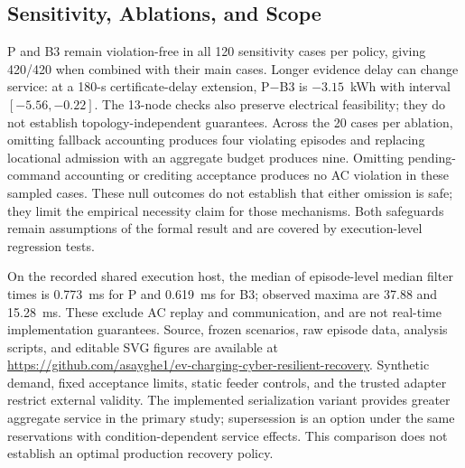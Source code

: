 \subsection{Sensitivity, Ablations, and Scope}
P and B3 remain violation-free in all 120 sensitivity cases per policy,
giving 420/420 when combined with their main cases. Longer evidence delay
can change service: at a 180-s certificate-delay extension, P$-$B3 is
$-3.15$~kWh with interval $[-5.56,-0.22]$. The 13-node checks also preserve
electrical feasibility; they do not establish topology-independent guarantees.
Across the 20 cases per ablation, omitting fallback accounting produces four
violating episodes and replacing locational admission with an aggregate budget
produces nine. Omitting pending-command accounting or crediting acceptance
produces no AC violation in these sampled cases. These null outcomes do not
establish that either omission is safe; they limit the empirical necessity
claim for those mechanisms. Both safeguards remain assumptions of the formal
result and are covered by execution-level regression tests.

On the recorded shared execution host, the median of episode-level median
filter times is 0.773~ms for P and 0.619~ms for B3; observed maxima are
37.88 and 15.28~ms. These exclude AC replay and communication, and are not
real-time implementation guarantees. Source, frozen scenarios, raw episode data,
analysis scripts, and editable SVG figures are available at
\url{https://github.com/asayghe1/ev-charging-cyber-resilient-recovery}.
Synthetic demand, fixed acceptance limits, static feeder controls, and the
trusted adapter restrict external validity. The implemented serialization
variant provides greater aggregate service in the primary study; supersession
is an option under the same reservations with condition-dependent service
effects. This comparison does not establish an optimal production recovery policy.

